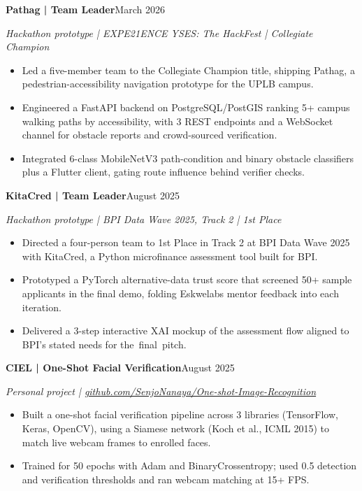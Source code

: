 \documentclass[11pt,letterpaper]{article}
\newcommand{\entry}[2]{\par\vspace{4pt}\textbf{#1}\hfill #2\par}
\newcommand{\subentry}[1]{\textit{#1}\par}
\begin{document}
\entry{Pathag | Team Leader}{March 2026}
\subentry{Hackathon prototype | EXPE21ENCE YSES: The HackFest | Collegiate Champion}
\begin{itemize}
  \item Led a five-member team to the Collegiate Champion title, shipping Pathag, a pedestrian-accessibility navigation prototype for the UPLB campus.
  \item Engineered a FastAPI backend on PostgreSQL/PostGIS ranking 5+ campus walking paths by accessibility, with 3 REST endpoints and a WebSocket channel for obstacle reports and crowd-sourced verification.
  \item Integrated 6-class MobileNetV3 path-condition and binary obstacle classifiers plus a Flutter client, gating route influence behind verifier checks.
\end{itemize}

\entry{KitaCred | Team Leader}{August 2025}
\subentry{Hackathon prototype | BPI Data Wave 2025, Track 2 | 1st Place}
\begin{itemize}
  \item Directed a four-person team to 1st Place in Track 2 at BPI Data Wave 2025 with KitaCred, a Python microfinance assessment tool built for BPI.
  \item Prototyped a PyTorch alternative-data trust score that screened 50+ sample applicants in the final demo, folding Eskwelabs mentor feedback into each iteration.
  \item Delivered a 3-step interactive XAI mockup of the assessment flow aligned to BPI's stated needs for the~final~pitch.
\end{itemize}

\entry{CIEL | One-Shot Facial Verification}{August 2025}
\subentry{Personal project | \href{https://github.com/SenjoNanaya/One-shot-Image-Recognition}{github.com/SenjoNanaya/One-shot-Image-Recognition}}
\begin{itemize}
  \item Built a one-shot facial verification pipeline across 3 libraries (TensorFlow, Keras, OpenCV), using a Siamese network (Koch et al., ICML 2015) to match live webcam frames to enrolled faces.
  \item Trained for 50 epochs with Adam and BinaryCrossentropy; used 0.5 detection and verification thresholds and ran webcam matching at 15+ FPS.
\end{itemize}
\end{document}
